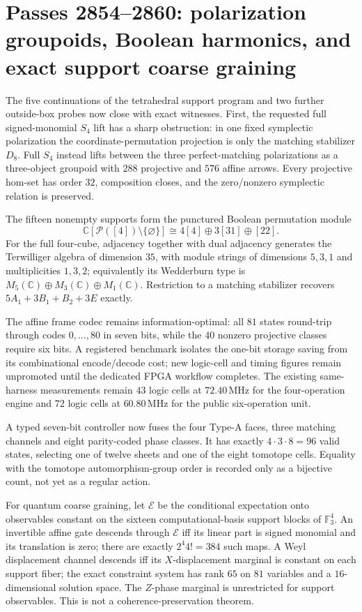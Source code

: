 \section*{Passes 2854--2860: polarization groupoids, Boolean harmonics, and exact support coarse graining}

The five continuations of the tetrahedral support program and two further
outside-box probes now close with exact witnesses.  First, the requested full
signed-monomial $S_4$ lift has a sharp obstruction: in one fixed symplectic
polarization the coordinate-permutation projection is only the matching
stabilizer $D_8$.  Full $S_4$ instead lifts between the three perfect-matching
polarizations as a three-object groupoid with $288$ projective and $576$ affine
arrows.  Every projective hom-set has order $32$, composition closes, and the
zero/nonzero symplectic relation is preserved.

The fifteen nonempty supports form the punctured Boolean permutation module
\[
  \mathbb C[\mathcal P([4])\setminus\{\varnothing\}]
  \cong 4[4]\oplus3[31]\oplus[22].
\]
For the full four-cube, adjacency together with dual adjacency generates the
Terwilliger algebra of dimension $35$, with module strings of dimensions
$5,3,1$ and multiplicities $1,3,2$; equivalently its Wedderburn type is
$M_5(\mathbb C)\oplus M_3(\mathbb C)\oplus M_1(\mathbb C)$.  Restriction to a
matching stabilizer recovers $5A_1+3B_1+B_2+3E$ exactly.

The affine frame codec remains information-optimal: all $81$ states round-trip
through codes $0,\ldots,80$ in seven bits, while the $40$ nonzero projective
classes require six bits.  A registered benchmark isolates the one-bit storage
saving from its combinational encode/decode cost; new logic-cell and timing
figures remain unpromoted until the dedicated FPGA workflow completes.  The
existing same-harness measurements remain $43$ logic cells at $72.40\,$MHz for
the four-operation engine and $72$ logic cells at $60.80\,$MHz for the public
six-operation unit.

A typed seven-bit controller now fuses the four Type-A faces, three matching
channels and eight parity-coded phase classes.  It has exactly
$4\cdot3\cdot8=96$ valid states, selecting one of twelve sheets and one of the
eight tomotope cells.  Equality with the tomotope automorphism-group order is
recorded only as a bijective count, not yet as a regular action.

For quantum coarse graining, let $\mathcal E$ be the conditional expectation
onto observables constant on the sixteen computational-basis support blocks of
$\mathbb F_3^4$.  An invertible affine gate descends through $\mathcal E$ iff
its linear part is signed monomial and its translation is zero; there are
exactly $2^4 4!=384$ such maps.  A Weyl displacement channel descends iff its
$X$-displacement marginal is constant on each support fiber; the exact
constraint system has rank $65$ on $81$ variables and a $16$-dimensional
solution space.  The $Z$-phase marginal is unrestricted for support
observables.  This is not a coherence-preservation theorem.

